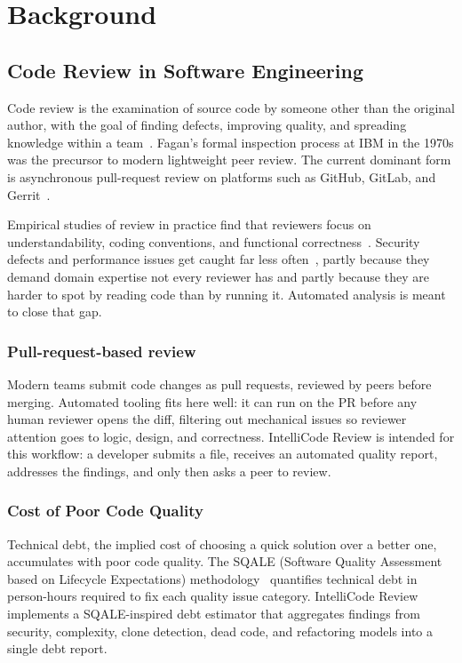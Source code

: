 \documentclass[12pt, oneside]{report}
\begin{document}
\chapter{Background}
\label{ch:background}

\section{Code Review in Software Engineering}
\label{sec:bg-codereview}

Code review is the examination of source code by someone other than the original author,
with the goal of finding defects, improving quality, and spreading knowledge within a
team~\cite{fagan1976}. Fagan's formal inspection process at IBM in the 1970s was the
precursor to modern lightweight peer review. The current dominant form is asynchronous
pull-request review on platforms such as GitHub, GitLab, and Gerrit~\cite{bacchelli2013}.

Empirical studies of review in practice find that reviewers focus on understandability,
coding conventions, and functional correctness~\cite{bacchelli2013}. Security defects and performance issues get caught far less often~\cite{mcintosh2016},
partly because they demand domain expertise not every reviewer has and partly because
they are harder to spot by reading code than by running it. Automated analysis is meant
to close that gap.

\subsection{Pull-request-based review}

Modern teams submit code changes as pull requests, reviewed by peers before merging.
Automated tooling fits here well: it can run on the PR before any human reviewer opens
the diff, filtering out mechanical issues so reviewer attention goes to logic, design,
and correctness. IntelliCode Review
is intended for this workflow: a developer submits a file, receives an automated quality report, addresses the findings, and only then asks a peer to review.

\subsection{Cost of Poor Code Quality}

Technical debt, the implied cost of choosing a quick solution over a better one, accumulates with poor code quality. The SQALE (Software Quality
Assessment based on Lifecycle Expectations) methodology~\cite{letouzey2012} quantifies
technical debt in person-hours required to fix each quality issue category. IntelliCode
Review implements a SQALE-inspired debt estimator that aggregates findings from security,
complexity, clone detection, dead code, and refactoring models into a single debt report.
\end{document}
